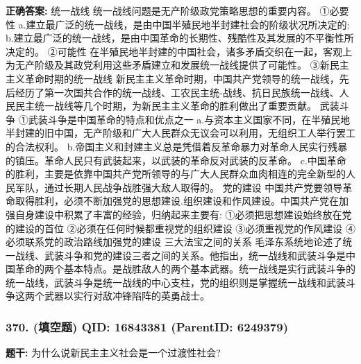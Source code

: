 \documentclass[12pt,UTF8]{ctexart}
\begin{document}
\textbf{正确答案:}
统一战线
统一战线问题是无产阶级政党策略思想的重要内容。
①必要性
a.建立最广泛的统一战线，是由中国半殖民地半封建社会的阶级状况所决定的:
b.建立最广泛的统一战线，是由中国革命的长期性、残酷性及其发展的不平衡性所决定的。
②可能性
在半殖民地半封建的中国社会，诸多矛盾交织在一起，客观上为无产阶级及其政党利用这些矛盾建立和发展统一战线提供了可能性。
③新民主主义革命时期的统一战线
新民主主义革命时期，中国共产党领导的统一战线，先后经历了第一次国共合作的统一战线、工农民主统-战线、抗日民族统一战线、人民民主统一战线等几个时期，为新民主主义革命的胜利做出了重要贡献。
武装斗争
①武装斗争是中国革命的特点和优点之一
a.与资本主义国家不同，在半殖民地半封建的旧中国，无产阶级和广大人民群众无议会可以利用，无组织工人举行罢工的合法权利。
b.帝国主义和封建主义总是凭借着反革命暴力对革命人民实行残暴的镇压。革命人民只有武装起来，以武装的革命反对武装的反革命。
c.中国革命的胜利，主要是依靠中国共产党所领导的与广大人民群众血肉相连的完全新型的人民军队，通过长期人民战争战胜强大敌人取得的。
党的建设
中国共产党要领导革命取得胜利，必须不断加强党的思想建设.组织建设和作风建设。中国共产党在加强自身建设中积累了丰富的经验，归纳起来主要有:
①必须把思想建设始终放在党的建设的首位
②必须在任何时候都重视党的组织建设
③必须重视党的作风建设
④必须联系党的政治路线加强党的建设
三大法宝之间的关系
毛泽东系统地论述了统一战线、武装斗争和党的建设三者之间的关系。他指出，统一战线和武装斗争是中国革命的两个基本特点。是战胜敌人的两个基本武器。统一战线是实行武装斗争的统一战线，武装斗争是统一战线的中心支柱，党的组织则是掌握统一战线和武装斗争这两个武器以实行对敌冲锋陷阵的英勇战士。

\vspace{0.3em}\hrulefill\vspace{0.7em}

\subsubsection*{370. (填空题) \small QID: 16843381 (ParentID: 6249379)}

\textbf{题干:}
为什么说新民主主义社会是一个过渡性社会?
\end{document}
